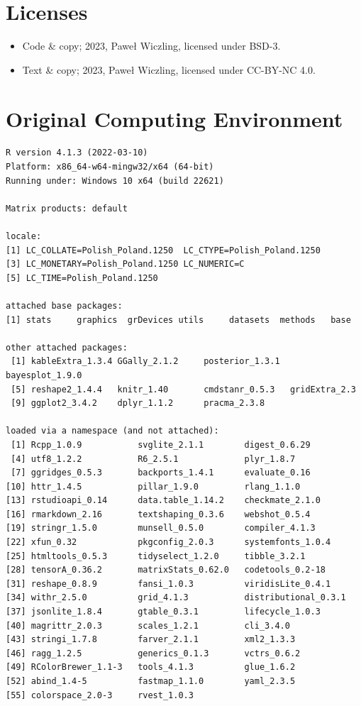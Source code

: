 \documentclass[
]{article}
\providecommand{\tightlist}{%
  \setlength{\itemsep}{0pt}\setlength{\parskip}{0pt}}\usepackage{longtable,booktabs,array}
\begin{document}
\newpage{}

\hypertarget{licenses}{%
\section*{Licenses}\label{licenses}}

\begin{itemize}
\tightlist
\item
  Code \& copy; 2023, Paweł Wiczling, licensed under BSD-3.
\item
  Text \& copy; 2023, Paweł Wiczling, licensed under CC-BY-NC 4.0.
\end{itemize}

\hypertarget{original-computing-environment}{%
\section*{Original Computing
Environment}\label{original-computing-environment}}

\begin{verbatim}
R version 4.1.3 (2022-03-10)
Platform: x86_64-w64-mingw32/x64 (64-bit)
Running under: Windows 10 x64 (build 22621)

Matrix products: default

locale:
[1] LC_COLLATE=Polish_Poland.1250  LC_CTYPE=Polish_Poland.1250   
[3] LC_MONETARY=Polish_Poland.1250 LC_NUMERIC=C                  
[5] LC_TIME=Polish_Poland.1250    

attached base packages:
[1] stats     graphics  grDevices utils     datasets  methods   base     

other attached packages:
 [1] kableExtra_1.3.4 GGally_2.1.2     posterior_1.3.1  bayesplot_1.9.0 
 [5] reshape2_1.4.4   knitr_1.40       cmdstanr_0.5.3   gridExtra_2.3   
 [9] ggplot2_3.4.2    dplyr_1.1.2      pracma_2.3.8    

loaded via a namespace (and not attached):
 [1] Rcpp_1.0.9           svglite_2.1.1        digest_0.6.29       
 [4] utf8_1.2.2           R6_2.5.1             plyr_1.8.7          
 [7] ggridges_0.5.3       backports_1.4.1      evaluate_0.16       
[10] httr_1.4.5           pillar_1.9.0         rlang_1.1.0         
[13] rstudioapi_0.14      data.table_1.14.2    checkmate_2.1.0     
[16] rmarkdown_2.16       textshaping_0.3.6    webshot_0.5.4       
[19] stringr_1.5.0        munsell_0.5.0        compiler_4.1.3      
[22] xfun_0.32            pkgconfig_2.0.3      systemfonts_1.0.4   
[25] htmltools_0.5.3      tidyselect_1.2.0     tibble_3.2.1        
[28] tensorA_0.36.2       matrixStats_0.62.0   codetools_0.2-18    
[31] reshape_0.8.9        fansi_1.0.3          viridisLite_0.4.1   
[34] withr_2.5.0          grid_4.1.3           distributional_0.3.1
[37] jsonlite_1.8.4       gtable_0.3.1         lifecycle_1.0.3     
[40] magrittr_2.0.3       scales_1.2.1         cli_3.4.0           
[43] stringi_1.7.8        farver_2.1.1         xml2_1.3.3          
[46] ragg_1.2.5           generics_0.1.3       vctrs_0.6.2         
[49] RColorBrewer_1.1-3   tools_4.1.3          glue_1.6.2          
[52] abind_1.4-5          fastmap_1.1.0        yaml_2.3.5          
[55] colorspace_2.0-3     rvest_1.0.3         
\end{verbatim}
\end{document}
